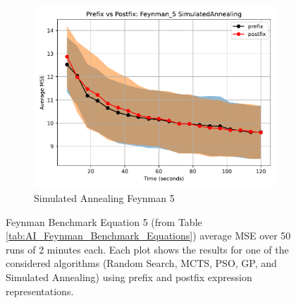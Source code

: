 \documentclass[runningheads]{llncs}
\begin{document}
\begin{figure}
    \vspace{0.5cm}
    
    \begin{subfigure}[b]{0.4\textwidth}
        \includegraphics[width=\linewidth, keepaspectratio]{AIFeynman_Benchmarks/PrePostFeynman_5SimulatedAnnealing.pdf}
        \caption{Simulated Annealing Feynman 5}
        \label{subfig:feynman_5_SA}
    \end{subfigure}
    
    \caption{Feynman Benchmark Equation 5 (from Table \ref{tab:AI_Feynman_Benchmark_Equations}) average MSE over 50 runs of 2 minutes each. Each plot shows the results for one of the considered algorithms (Random Search, MCTS, PSO, GP, and Simulated Annealing) using prefix and postfix expression representations.}
    \label{fig:AIFeynman_5_Benchmarks}
\end{figure}

\end{document}

